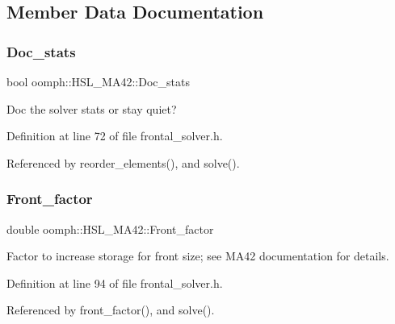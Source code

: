 \subsection{Member Data Documentation}
\mbox{\label{classoomph_1_1HSL__MA42_a186ee3391ad233b8150ef018578bf4d8}} 
\subsubsection{\texorpdfstring{Doc\+\_\+stats}{Doc\_stats}}
{\footnotesize\ttfamily bool oomph\+::\+H\+S\+L\+\_\+\+M\+A42\+::\+Doc\+\_\+stats\hspace{0.3cm}{\ttfamily [private]}}



Doc the solver stats or stay quiet? 



Definition at line 72 of file frontal\+\_\+solver.\+h.



Referenced by reorder\+\_\+elements(), and solve().

\mbox{\label{classoomph_1_1HSL__MA42_aa685586e76b9e65184c4a2fd1866b1bb}} 
\subsubsection{\texorpdfstring{Front\+\_\+factor}{Front\_factor}}
{\footnotesize\ttfamily double oomph\+::\+H\+S\+L\+\_\+\+M\+A42\+::\+Front\+\_\+factor\hspace{0.3cm}{\ttfamily [private]}}



Factor to increase storage for front size; see M\+A42 documentation for details. 



Definition at line 94 of file frontal\+\_\+solver.\+h.



Referenced by front\+\_\+factor(), and solve().

